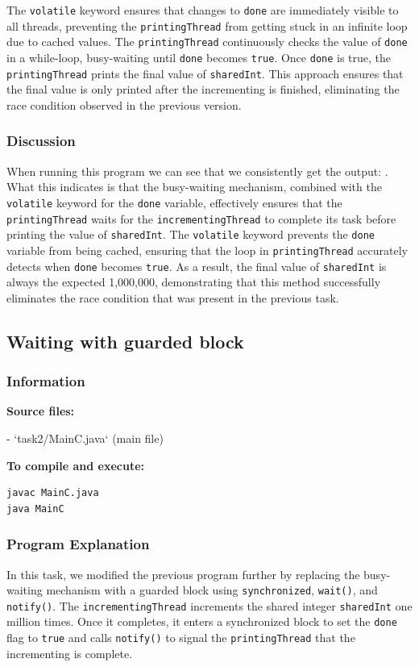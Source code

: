 \documentclass{article}
\begin{document}
The \texttt{volatile} keyword ensures that changes to \texttt{done} are immediately visible to all threads, preventing the \texttt{printingThread} from getting stuck in an infinite loop due to cached values. The \texttt{printingThread} continuously checks the value of \texttt{done} in a while-loop, busy-waiting until \texttt{done} becomes \texttt{true}. Once \texttt{done} is true, the \texttt{printingThread} prints the final value of \texttt{sharedInt}. This approach ensures that the final value is only printed after the incrementing is finished, eliminating the race condition observed in the previous version.

\subsubsection{Discussion}
When running this program we can see that we consistently get the output: . What this indicates is that the busy-waiting mechanism, combined with the \texttt{volatile} keyword for the \texttt{done} variable, effectively ensures that the \texttt{printingThread} waits for the \texttt{incrementingThread} to complete its task before printing the value of \texttt{sharedInt}. The \texttt{volatile} keyword prevents the \texttt{done} variable from being cached, ensuring that the loop in \texttt{printingThread} accurately detects when \texttt{done} becomes \texttt{true}. As a result, the final value of \texttt{sharedInt} is always the expected 1,000,000, demonstrating that this method successfully eliminates the race condition that was present in the previous task.


\subsection{Waiting with guarded block} \label{GuardBlock}

\subsubsection{Information}
\textbf{Source files:}

- `task2/MainC.java` (main file)

\textbf{To compile and execute:}
\begin{lstlisting}[style=bash]
javac MainC.java
java MainC
\end{lstlisting}

\subsubsection{Program Explanation}
In this task, we modified the previous program further by replacing the busy-waiting mechanism with a guarded block using \texttt{synchronized}, \texttt{wait()}, and \texttt{notify()}. The \texttt{incrementingThread} increments the shared integer \texttt{sharedInt} one million times. Once it completes, it enters a synchronized block to set the \texttt{done} flag to \texttt{true} and calls \texttt{notify()} to signal the \texttt{printingThread} that the incrementing is complete.
\end{document}
